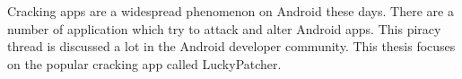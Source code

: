 Cracking apps are a widespread phenomenon on Android these days.
There are a number of application which try to attack and alter Android apps.
This piracy thread is discussed a lot in the Android developer community.
This thesis focuses on the popular cracking app called LuckyPatcher.
